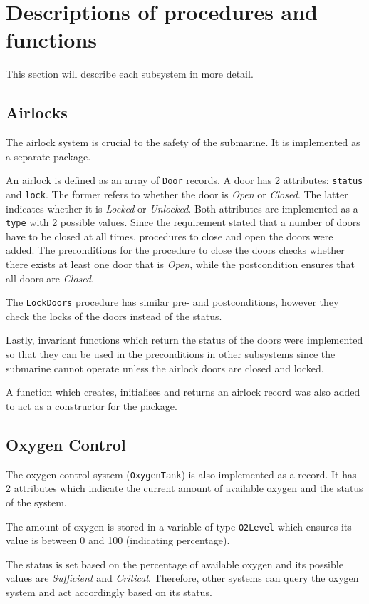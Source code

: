 \documentclass{llncs}
\begin{document}
\section{Descriptions of procedures and functions}
This section will describe each subsystem in more detail.

\subsection{Airlocks}
The airlock system is crucial to the safety of the submarine. It is implemented as a separate package. 

An airlock is defined as an array of \texttt{Door} records. A door has 2 attributes: \texttt{status} and \texttt{lock}. The former refers to whether the door is \textit{Open} or \textit{Closed}. The latter indicates whether it is \textit{Locked} or \textit{Unlocked}. Both attributes are implemented as a \texttt{type} with 2 possible values. Since the requirement stated that a number of doors have to be closed at all times, procedures to close and open the doors were added. The preconditions for the procedure to close the doors checks whether there exists at least one door that is \textit{Open}, while the postcondition ensures that all doors are \textit{Closed}. 

The \texttt{LockDoors} procedure has similar pre- and postconditions, however they check the locks of the doors instead of the status. 

Lastly, invariant functions which return the status of the doors were implemented so that they can be used in the preconditions in other subsystems since the submarine cannot operate unless the airlock doors are closed and locked.

A function which creates, initialises and returns an airlock record was also added to act as a constructor for the package.

\subsection{Oxygen Control}
The oxygen control system (\texttt{OxygenTank}) is also implemented as a record. It has 2 attributes which indicate the current amount of available oxygen and the status of the system. 

The amount of oxygen is stored in a variable of type \texttt{O2Level} which ensures its value is between 0 and 100 (indicating percentage). 

The status is set based on the percentage of available oxygen and its possible values are \textit{Sufficient} and \textit{Critical}. Therefore, other systems can query the oxygen system and act accordingly based on its status.
\end{document}
